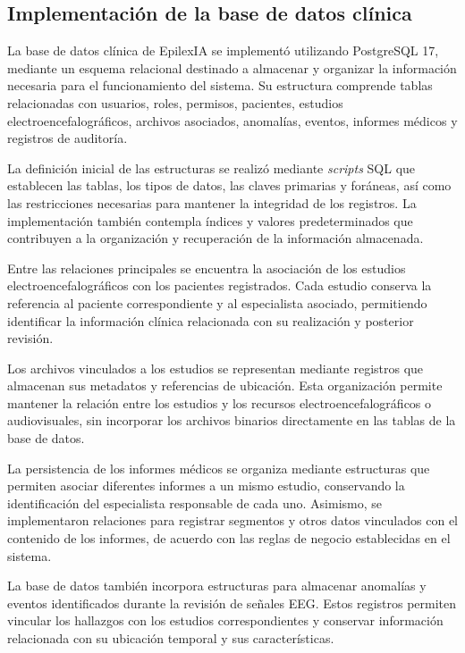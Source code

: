 \subsection{Implementación de la base de datos clínica}

La base de datos clínica de EpilexIA se implementó utilizando
PostgreSQL 17, mediante un esquema relacional destinado a
almacenar y organizar la información necesaria para el
funcionamiento del sistema. Su estructura comprende tablas
relacionadas con usuarios, roles, permisos, pacientes,
estudios electroencefalográficos, archivos asociados,
anomalías, eventos, informes médicos y registros de
auditoría.

La definición inicial de las estructuras se realizó
mediante \textit{scripts} SQL que establecen las tablas, los tipos
de datos, las claves primarias y foráneas, así como las
restricciones necesarias para mantener la integridad de
los registros. La implementación también contempla
índices y valores predeterminados que contribuyen a la
organización y recuperación de la información almacenada.

Entre las relaciones principales se encuentra la
asociación de los estudios electroencefalográficos
con los pacientes registrados. Cada estudio conserva
la referencia al paciente correspondiente y al
especialista asociado, permitiendo identificar la
información clínica relacionada con su realización
y posterior revisión.

Los archivos vinculados a los estudios se representan
mediante registros que almacenan sus metadatos y
referencias de ubicación. Esta organización permite
mantener la relación entre los estudios y los recursos
electroencefalográficos o audiovisuales, sin incorporar
los archivos binarios directamente en las tablas de
la base de datos.

La persistencia de los informes médicos se organiza
mediante estructuras que permiten asociar diferentes
informes a un mismo estudio, conservando la identificación
del especialista responsable de cada uno. Asimismo,
se implementaron relaciones para registrar segmentos
y otros datos vinculados con el contenido de los
informes, de acuerdo con las reglas de negocio
establecidas en el sistema.

La base de datos también incorpora estructuras para
almacenar anomalías y eventos identificados durante
la revisión de señales EEG. Estos registros permiten
vincular los hallazgos con los estudios correspondientes
y conservar información relacionada con su ubicación
temporal y sus características.

